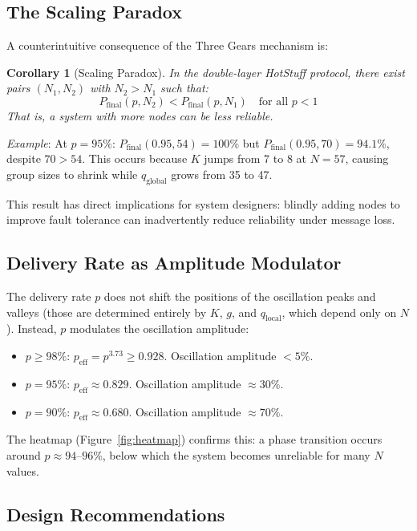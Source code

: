 \documentclass[
12pt,
oneside,
singlespacing,
parskip,
]{article}
\newtheorem{corollary}{Corollary}[section]
\begin{document}
\subsection{The Scaling Paradox}

A counterintuitive consequence of the Three Gears mechanism is:

\begin{corollary}[Scaling Paradox]
In the double-layer HotStuff protocol, there exist pairs $(N_1, N_2)$ with $N_2 > N_1$ such that:
\[
  P_\mathrm{final}(p, N_2) < P_\mathrm{final}(p, N_1) \quad \text{for all } p < 1
\]
That is, a system with \emph{more} nodes can be \emph{less} reliable.
\end{corollary}

\textit{Example}: At $p = 95\%$: $P_\mathrm{final}(0.95, 54) = 100\%$ but $P_\mathrm{final}(0.95, 70) = 94.1\%$, despite $70 > 54$. This occurs because $K$ jumps from 7 to 8 at $N = 57$, causing group sizes to shrink while $q_\mathrm{global}$ grows from 35 to 47.

This result has direct implications for system designers: blindly adding nodes to improve fault tolerance can inadvertently reduce reliability under message loss.

\subsection{Delivery Rate as Amplitude Modulator}

The delivery rate $p$ does not shift the positions of the oscillation peaks and valleys (those are determined entirely by $K$, $g$, and $q_\mathrm{local}$, which depend only on $N$). Instead, $p$ modulates the oscillation amplitude:

\begin{itemize}
  \item $p \geq 98\%$: $p_\mathrm{eff} = p^{3.73} \geq 0.928$. Oscillation amplitude $< 5\%$.
  \item $p = 95\%$: $p_\mathrm{eff} \approx 0.829$. Oscillation amplitude $\approx 30\%$.
  \item $p = 90\%$: $p_\mathrm{eff} \approx 0.680$. Oscillation amplitude $\approx 70\%$.
\end{itemize}

The heatmap (Figure~\ref{fig:heatmap}) confirms this: a phase transition occurs around $p \approx 94$--$96\%$, below which the system becomes unreliable for many $N$ values.

\subsection{Design Recommendations}
\end{document}
